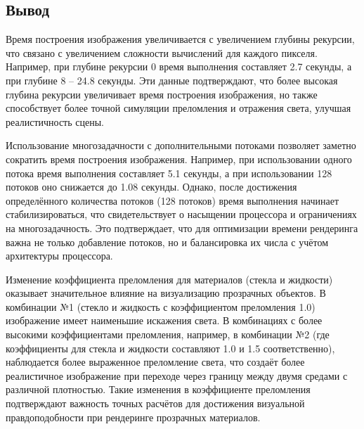 \subsection*{Вывод}

Время построения изображения увеличивается с увеличением глубины рекурсии, что связано с увеличением сложности вычислений для каждого пикселя. Например, при глубине рекурсии 0 время выполнения составляет 2.7 секунды, а при глубине 8 -- 24.8 секунды. Эти данные подтверждают, что более высокая глубина рекурсии увеличивает время построения изображения, но также способствует более точной симуляции преломления и отражения света, улучшая реалистичность сцены.

Использование многозадачности с дополнительными потоками позволяет заметно сократить время построения изображения. Например, при использовании одного потока время выполнения составляет 5.1 секунды, а при использовании 128 потоков оно снижается до 1.08 секунды. Однако, после достижения определённого количества потоков (128 потоков) время выполнения начинает стабилизироваться, что свидетельствует о насыщении процессора и ограничениях на многозадачность. Это подтверждает, что для оптимизации времени рендеринга важна не только добавление потоков, но и балансировка их числа с учётом архитектуры процессора.

Изменение коэффициента преломления для материалов (стекла и жидкости) оказывает значительное влияние на визуализацию прозрачных объектов. В комбинации №1 (стекло и жидкость с коэффициентом преломления 1.0) изображение имеет наименьшие искажения света. В комбинациях с более высокими коэффициентами преломления, например, в комбинации №2 (где коэффициенты для стекла и жидкости составляют 1.0 и 1.5 соответственно), наблюдается более выраженное преломление света, что создаёт более реалистичное изображение при переходе через границу между двумя средами с различной плотностью. Такие изменения в коэффициенте преломления подтверждают важность точных расчётов для достижения визуальной правдоподобности при рендеринге прозрачных материалов.



